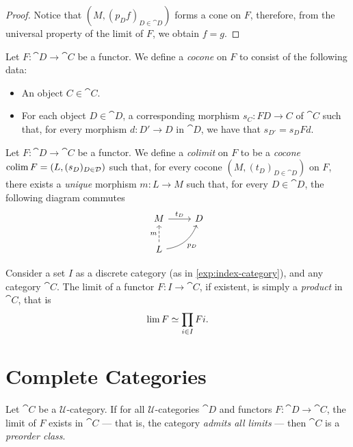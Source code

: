 \begin{proof}
Notice that \((M, (p_D f)_{D \in \cat D})\) forms a cone on \(F\), therefore,
from the universal property of the limit of \(F\), we obtain \(f = g\).
\end{proof}

\begin{definition}[Cocone]
\label{def:cocone}
Let \(F: \cat D \to \cat C\) be a functor. We define a \emph{cocone} on \(F\) to
consist of the following data:
\begin{itemize}\setlength\itemsep{0em}
\item An object \(C \in \cat C\).

\item For each object \(D \in \cat D\), a corresponding morphism \(s_C: F D \to
  C\) of \(\cat C\) such that, for every morphism \(d: D' \to D\) in \(\cat D\),
  we have that \(s_{D'} = s_D F d\).
\end{itemize}
\end{definition}

\begin{definition}[Colimit]
\label{def:colimit}
Let \(F: \cat D \to \cat C\) be a functor. We define a \emph{colimit} on \(F\)
to be a \emph{cocone} \(\operatorname{colim} F = (L, (s_D)_{D \in \mathcal D})\) such that, for
every cocone \((M, (t_D)_{D \in \cat D})\) on \(F\), there exists a
\emph{unique} morphism \(m: L \to M\) such that, for every \(D \in \cat D\), the
following diagram commutes
\[
\begin{tikzcd}
M \ar[r, "t_D"] &D \\
L \ar[u, dashed, "m"] \ar[ru, bend right, "p_D"'] &
\end{tikzcd}
\]
\end{definition}

\begin{example}[Products]
\label{exp:product-is-limit-over-indexing-set-diagram}
Consider a set \(I\) as a discrete category (as in \cref{exp:index-category}),
and any category \(\cat C\). The limit of a functor \(F: I \to \cat C\), if
existent, is simply a \emph{product} in \(\cat C\), that is
\[
\operatorname{lim} F \simeq \prod_{i \in I} F i.
\]
\end{example}

\section{Complete Categories}

\begin{proposition}
\label{prop:all-limits-is-preorder}
Let \(\cat C\) be a \(\mathcal{U}\)-category. If for all
\(\mathcal{U}\)-categories \(\cat D\) and functors \(F: \cat D \to \cat C\), the
limit of \(F\) exists in \(\cat C\) --- that is, the category \emph{admits all
  limits} --- then \(\cat C\) is a \emph{preorder class}.
\end{proposition}

